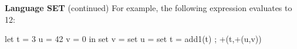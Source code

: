\begin{minipage}[t]{\sw}
\slidenumber
\LARGE
{\bf Language SET} (continued)\exx
For example, the following expression evaluates to 12:
\begin{qv}
let
  t = 3
  u = 42
  v = 0
in
  { set v = set u = set t = add1(t) ; +(t,+(u,v)) }
\end{qv}
\end{minipage}
